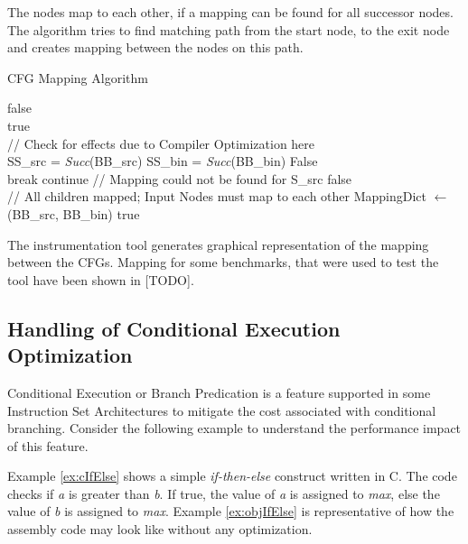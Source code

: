 The nodes map to each other, if a mapping can be found for all successor nodes. The algorithm tries to find matching path from the start node, to the exit node and creates mapping between the nodes on this path.

\begin{algorithm}[h!]
\caption{CFG Mapping Algorithm}\label{algo:mapping}
\begin{algorithmic}[1]
\State \Return false
\EndIf
\\
\State \Return true
\EndIf
\\
\State // Check for effects due to Compiler Optimization here
\\
\State SS\_src = \textit{Succ}(BB\_src)
\State SS\_bin = \textit{Succ}(BB\_bin)
\State \Return False
\EndIf
\\
\State break
\Else
\State continue
\EndIf
\EndFor
\State // Mapping could not be found for S\_src
\State \Return false
\EndFor
\\
\State // All children mapped; Input Nodes must map to each other
\State MappingDict $\leftarrow$ (BB\_src, BB\_bin)
\State \Return true
\\
\EndFunction
\end{algorithmic}
\end{algorithm}

The instrumentation tool generates graphical representation of the mapping between the CFGs. Mapping for some benchmarks, that were used to test the tool have been shown in [TODO].

\subsection{Handling of Conditional Execution Optimization}
\label{subsec:CondExec}
Conditional Execution or Branch Predication is a feature supported in some Instruction Set Architectures to mitigate the cost associated with conditional branching. Consider the following example to understand the performance impact of this feature.

Example \ref{ex:cIfElse} shows a simple \emph{if-then-else} construct written in C. The code checks if \emph{a} is greater than \emph{b}. If true, the value of \emph{a} is assigned to \emph{max}, else the value of \emph{b} is assigned to \emph{max}. Example \ref{ex:objIfElse} is representative of how the assembly code may look like without any optimization.

